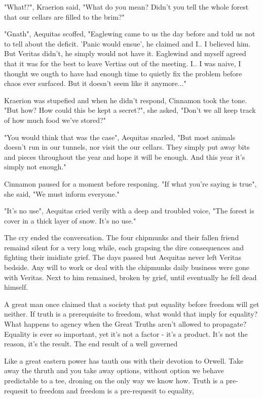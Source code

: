 \documentclass[smalldemyvopaper,11pt,twoside,onecolumn,openright,extrafontsizes]{memoir}
\begin{document}
"What!?", Kraerion said, "What do you mean? Didn't you tell the whole forest that our cellars are filled to the brim?"

"Gnath", Aequitas scoffed, "Eaglewing came to us the day before and told us not to tell about the deficit. 'Panic would ensue', he claimed and I.. I believed him. But Veritas didn't, he simply would not have it. Eaglewind and myself agreed that it was for the best to leave Vertias out of the meeting. I.. I was naive, I thought we ougth to have had enough time to quietly fix the problem before chaos ever surfaced. But it doesn't seem like it anymore..."

Kraerion was stupefied and when he didn't respond, Cinnamon took the tone. "But how? How could this be kept a secret?", she asked, "Don't we all keep track of how much food we've stored?"

"You would think that was the case", Aequitas snarled, "But most animals doesn't run in our tunnels, nor visit the our cellars. They simply put away bits and pieces throughout the year and hope it will be enough. And this year it's simply not enough."

Cinnamon paused for a moment before responing. "If what you're saying is true", she said, "We must inform everyone."

"It's no use", Aequitas cried verily with a deep and troubled voice, "The forest is cover in a thick layer of snow. It's no use."

The cry ended the conversation. The four chipmunks and their fallen friend remaind silent for a very long while, each grapsing the dire consequences and fighting their imidiate grief. The days passed but Aequitas never left Veritas bedside. Any will to work or deal with the chipmunks daily business were gone with Veritas. Next to him remained, broken by grief, until eventually he fell dead himself. 

A great man once claimed that a society that put equality before freedom will get neither. If truth is a prerequisite to freedom, what would that imply for equality? What happens to agency when the Great Truths aren't allowed to propagate? Equality is ever so important, yet it's not a factor - it's a product. It's not the reason, it's the result. The end result of a well governed 

Like a great eastern power has tauth ous with their devotion to Orwell. Take away the thruth and you take away options, without option we behave predictable to a tee, droning on the only way we know how. Truth is a pre-requesit to freedom and freedom is a pre-requesit to equality, 
\end{document}
